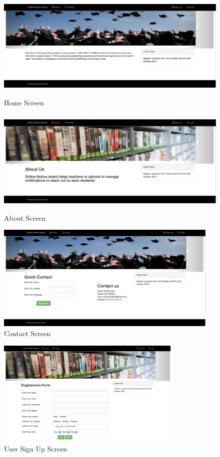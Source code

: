 \documentclass[12pt,a4paper]{article}
\begin{document}
    \begin{figure}[H]
    	\centering
    	\includegraphics[width=\textwidth,height=2in]{figures/homepage.png}
    	\caption{Home Screen}
    \end{figure}
    
    \begin{figure}[H]
    	\centering
    	\includegraphics[width=\textwidth,height=2in]{figures/about.png}
    	\caption{About Screen}
    \end{figure}
    
    \begin{figure}[H]
    	\centering
    	\includegraphics[width=\textwidth,height=2in]{figures/contact.png}
    	\caption{Contact Screen}
    \end{figure}
    
    \begin{figure}[H]
    	\centering
    	\includegraphics[width=\textwidth,height=2in]{figures/user_registration.png}
    	\caption{User Sign Up Screen}
    \end{figure}
    
\end{document}
